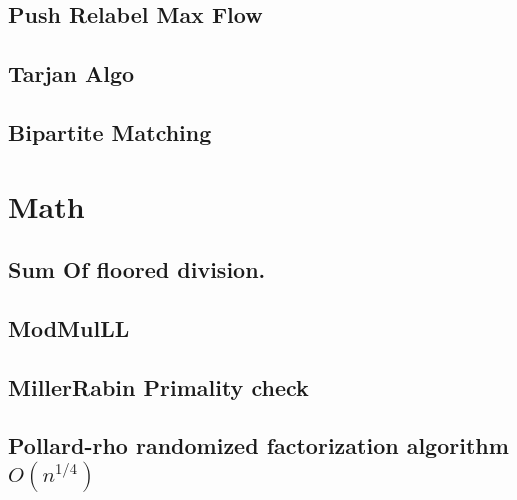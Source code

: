 \subsection{Push Relabel Max Flow}
\vspace{-2ex}
\raggedbottom
\vspace{-3.2ex}
\hrulefill
\subsection{Tarjan Algo}
\vspace{-2ex}
\raggedbottom
\vspace{-3.2ex}
\hrulefill
\subsection{Bipartite Matching}
\vspace{-2ex}
\raggedbottom
\vspace{-3.2ex}
\hrulefill

\section{Math}
\subsection{Sum Of floored division.}
\vspace{-2ex}
\raggedbottom
\vspace{-3.2ex}
\hrulefill
\subsection{ModMulLL}
\vspace{-2ex}
\raggedbottom
\vspace{-3.2ex}
\hrulefill
\subsection{MillerRabin Primality check}
\vspace{-2ex}
\raggedbottom
\vspace{-3.2ex}
\hrulefill
\subsection{Pollard-rho randomized factorization algorithm ${O(n^{1/4})}$}
\vspace{-2ex}
\raggedbottom
\vspace{-3.2ex}
\hrulefill
